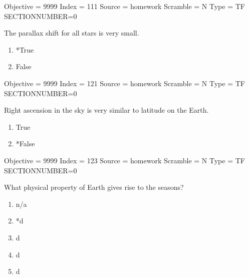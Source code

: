 \documentclass[11pt]{article}
\begin{document}
\begin{enumerate}
\begin{minipage}{\textwidth}
\begin{minipage}{\textwidth}
Objective = 9999
Index = 111
Source = homework
Scramble = N
Type = TF
SECTIONNUMBER=0
\end{minipage}
\end{minipage}
\vskip 0.20in

\begin{minipage}{\textwidth}
\begin{minipage}{\textwidth}
\item The parallax shift for all stars is very small.
\begin{multicols}{3}
\begin{enumerate} 
\setlength{\itemsep}{1pt} 
\setlength{\parskip}{0pt} 
\setlength{\parsep}{0pt}
\setlength{\multicolsep}{1pt} 
\item *True
\item False
\end{enumerate} 
\vfill 
\end{multicols}

Objective = 9999
Index = 121
Source = homework
Scramble = N
Type = TF
SECTIONNUMBER=0
\end{minipage}
\end{minipage}
\vskip 0.20in

\begin{minipage}{\textwidth}
\begin{minipage}{\textwidth}
\item Right ascension in the sky is very similar to latitude on the Earth.
\begin{multicols}{3}
\begin{enumerate} 
\setlength{\itemsep}{1pt} 
\setlength{\parskip}{0pt} 
\setlength{\parsep}{0pt}
\setlength{\multicolsep}{1pt} 
\item True
\item *False
\end{enumerate} 
\vfill 
\end{multicols}

Objective = 9999
Index = 123
Source = homework
Scramble = N
Type = TF
SECTIONNUMBER=0
\end{minipage}
\end{minipage}
\vskip 0.20in

\begin{minipage}{\textwidth}
\begin{minipage}{\textwidth}
\item What physical property of Earth gives rise to the seasons?
\begin{multicols}{3}
\begin{enumerate} 
\setlength{\itemsep}{1pt} 
\setlength{\parskip}{0pt} 
\setlength{\parsep}{0pt}
\setlength{\multicolsep}{1pt} 
\item n/a
\item *d
\item d
\item d
\item d
\end{enumerate} 
\vfill 
\end{multicols}


\end{minipage}
\end{minipage}
\end{enumerate}
\end{document}
